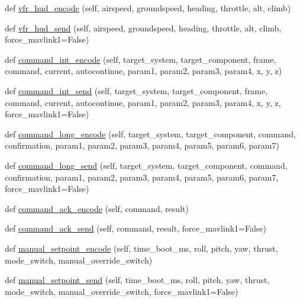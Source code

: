 \begin{DoxyCompactItemize}
\item 
def \hyperlink{classpymavlink_1_1dialects_1_1v10_1_1MAVLink_a86023dcc99c0ea72daf5f2025f3bfaac}{vfr\+\_\+hud\+\_\+encode} (self, airspeed, groundspeed, heading, throttle, alt, climb)
\item 
def \hyperlink{classpymavlink_1_1dialects_1_1v10_1_1MAVLink_a08a1e99dfe399723aed33f35767feaa7}{vfr\+\_\+hud\+\_\+send} (self, airspeed, groundspeed, heading, throttle, alt, climb, force\+\_\+mavlink1=False)
\item 
def \hyperlink{classpymavlink_1_1dialects_1_1v10_1_1MAVLink_ae60d7b66dfbd93f871983e4d0f97c3bc}{command\+\_\+int\+\_\+encode} (self, target\+\_\+system, target\+\_\+component, frame, command, current, autocontinue, param1, param2, param3, param4, x, y, z)
\item 
def \hyperlink{classpymavlink_1_1dialects_1_1v10_1_1MAVLink_a4ba9ab8087ba87d1f97a2f7b6009e2c0}{command\+\_\+int\+\_\+send} (self, target\+\_\+system, target\+\_\+component, frame, command, current, autocontinue, param1, param2, param3, param4, x, y, z, force\+\_\+mavlink1=False)
\item 
def \hyperlink{classpymavlink_1_1dialects_1_1v10_1_1MAVLink_a5d2568416da43730df5544a5c1e7b7a5}{command\+\_\+long\+\_\+encode} (self, target\+\_\+system, target\+\_\+component, command, confirmation, param1, param2, param3, param4, param5, param6, param7)
\item 
def \hyperlink{classpymavlink_1_1dialects_1_1v10_1_1MAVLink_a066f3a1ddcb8ba075a03635690b8d2c1}{command\+\_\+long\+\_\+send} (self, target\+\_\+system, target\+\_\+component, command, confirmation, param1, param2, param3, param4, param5, param6, param7, force\+\_\+mavlink1=False)
\item 
def \hyperlink{classpymavlink_1_1dialects_1_1v10_1_1MAVLink_a2b0f00937ec3ad188f3e7e8fdfeba758}{command\+\_\+ack\+\_\+encode} (self, command, result)
\item 
def \hyperlink{classpymavlink_1_1dialects_1_1v10_1_1MAVLink_a12e481b4a0f515626fdb12b5b3e1d809}{command\+\_\+ack\+\_\+send} (self, command, result, force\+\_\+mavlink1=False)
\item 
def \hyperlink{classpymavlink_1_1dialects_1_1v10_1_1MAVLink_ac275a76509810de25600f1659c5fc40c}{manual\+\_\+setpoint\+\_\+encode} (self, time\+\_\+boot\+\_\+ms, roll, pitch, yaw, thrust, mode\+\_\+switch, manual\+\_\+override\+\_\+switch)
\item 
def \hyperlink{classpymavlink_1_1dialects_1_1v10_1_1MAVLink_a59e40f9f9a824cb43963e4eb6bff383e}{manual\+\_\+setpoint\+\_\+send} (self, time\+\_\+boot\+\_\+ms, roll, pitch, yaw, thrust, mode\+\_\+switch, manual\+\_\+override\+\_\+switch, force\+\_\+mavlink1=False)

\end{DoxyCompactItemize}
